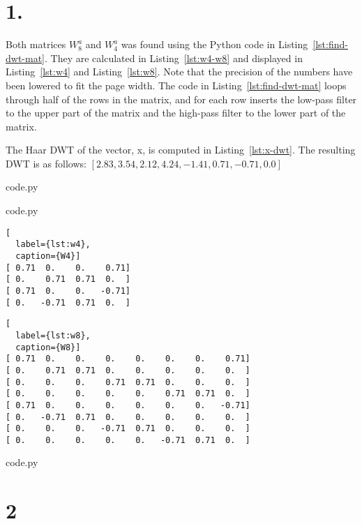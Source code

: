 \section*{1.}

Both matrices \(W^a_8\) and \(W^a_4\) was found using the Python code in Listing~\ref{lst:find-dwt-mat}.
They are calculated in Listing~\ref{lst:w4-w8} and displayed in Listing~\ref{lst:w4} and Listing~\ref{lst:w8}.
Note that the precision of the numbers have been lowered to fit the page width.
The code in Listing~\ref{lst:find-dwt-mat} loops through half of the rows in the matrix, and for each row inserts the low-pass filter to the upper part of the matrix and the high-pass filter to the lower part of the matrix.

The Haar DWT of the vector, x, is computed in Listing~\ref{lst:x-dwt}.
The resulting DWT is as follows: \([2.83, 3.54, 2.12, 4.24, -1.41, 0.71, -0.71, 0.0]\)


  {code.py}


  {code.py}

\begin{lstlisting}[
  label={lst:w4},
  caption={W4}]
[ 0.71  0.    0.    0.71]
[ 0.    0.71  0.71  0.  ]
[ 0.71  0.    0.   -0.71]
[ 0.   -0.71  0.71  0.  ]
\end{lstlisting}

\begin{lstlisting}[
  label={lst:w8},
  caption={W8}]
[ 0.71  0.    0.    0.    0.    0.    0.    0.71]
[ 0.    0.71  0.71  0.    0.    0.    0.    0.  ]
[ 0.    0.    0.    0.71  0.71  0.    0.    0.  ]
[ 0.    0.    0.    0.    0.    0.71  0.71  0.  ]
[ 0.71  0.    0.    0.    0.    0.    0.   -0.71]
[ 0.   -0.71  0.71  0.    0.    0.    0.    0.  ]
[ 0.    0.    0.   -0.71  0.71  0.    0.    0.  ]
[ 0.    0.    0.    0.    0.   -0.71  0.71  0.  ]
\end{lstlisting}


  {code.py}

\section*{2}

